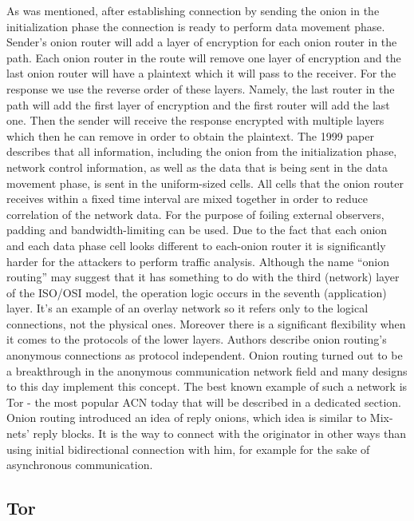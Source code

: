As was mentioned, after establishing connection by sending the onion in the initialization phase the connection is ready to perform data movement phase. Sender’s onion router will add a layer of encryption for each onion router in the path. Each onion router in the route will remove one layer of encryption and the last onion router will have a plaintext which it will pass to the receiver. For the response we use the reverse order of these layers. Namely, the last router in the path will add the first layer of encryption and the first router will add the last one. Then the sender will receive the response encrypted with multiple layers which then he can remove in order to obtain the plaintext.
The 1999 paper describes that all information, including the onion from the initialization phase, network control information, as well as the data that is being sent in the data movement phase, is sent in the uniform-sized cells. All cells that the onion router receives within a fixed time interval are mixed together in order to reduce correlation of the network data. For the purpose of foiling external observers, padding and bandwidth-limiting can be used. Due to the fact that each onion and each data phase cell looks different to each-onion router it is significantly harder for the attackers to perform traffic analysis.
Although the name “onion routing” may suggest that it has something to do with the third (network) layer of the ISO/OSI model, the operation logic occurs in the seventh (application) layer. It’s an example of an overlay network so it refers only to the logical connections, not the physical ones. Moreover there is a significant flexibility when it comes to the protocols of the lower layers. Authors describe onion routing’s anonymous connections as protocol independent.
Onion routing turned out to be a breakthrough in the anonymous communication network field and many designs to this day implement this concept. The best known example of such a network is Tor - the most popular ACN today that will be described in a dedicated section.
Onion routing introduced an idea of reply onions, which idea is similar to Mix-nets’ reply blocks. It is the way to connect with the originator in other ways than using initial bidirectional connection with him, for example for the sake of asynchronous communication.

\subsection{Tor}

